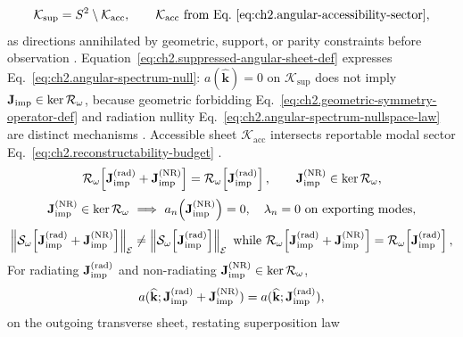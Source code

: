 \begin{equation}
\label{eq:ch2.suppressed-angular-sheet-def}
\mathcal{K}_{\mathrm{sup}}
=
S^{2}\setminus\mathcal{K}_{\mathrm{acc}},
\qquad
\mathcal{K}_{\mathrm{acc}}
\ \text{from Eq.~\eqref{eq:ch2.angular-accessibility-sector}},
\end{equation}
as directions annihilated by geometric, support, or parity constraints before observation
\cite{stratton1941}. Equation~\eqref{eq:ch2.suppressed-angular-sheet-def} expresses
Eq.~\eqref{eq:ch2.angular-spectrum-null}: \(a(\widehat{\mathbf{k}})=0\) on
\(\mathcal{K}_{\mathrm{sup}}\) does not imply \(\mathbf{J}_{\mathrm{imp}}\in\ker\mathcal{R}_\omega\), because
geometric forbidding Eq.~\eqref{eq:ch2.geometric-symmetry-operator-def} and radiation nullity
Eq.~\eqref{eq:ch2.angular-spectrum-nullspace-law} are distinct mechanisms
\cite{stratton1941}. Accessible sheet \(\mathcal{K}_{\mathrm{acc}}\) intersects reportable modal
sector Eq.~\eqref{eq:ch2.reconstructability-budget} \cite{harrington2001}.
\begin{equation}
\label{eq:ch2.nr-superposition-law}
\mathcal{R}_\omega\!\left[\mathbf{J}_{\mathrm{imp}}^{(\mathrm{rad})}+\mathbf{J}_{\mathrm{imp}}^{\mathrm{(NR)}}\right]
=
\mathcal{R}_\omega\!\left[\mathbf{J}_{\mathrm{imp}}^{(\mathrm{rad})}\right],
\qquad
\mathbf{J}_{\mathrm{imp}}^{\mathrm{(NR)}}\in\ker\mathcal{R}_\omega,
\end{equation}
\begin{equation}
\label{eq:ch2.nr-modal-invisibility}
\mathbf{J}_{\mathrm{imp}}^{\mathrm{(NR)}}\in\ker\mathcal{R}_\omega
\ \Longrightarrow\
a_n\!\left(\mathbf{J}_{\mathrm{imp}}^{\mathrm{(NR)}}\right)=0,
\quad
\lambda_n=0\ \text{on exporting modes,}
\end{equation}
\begin{equation}
\label{eq:ch2.nr-near-field-energy-law}
\left\|\mathcal{S}_\omega\!\left[\Jimp^{(\mathrm{rad})}+\Jimp^{\mathrm{(NR)}}\right]\right\|_{\mathcal{E}}
\neq
\left\|\mathcal{S}_\omega\!\left[\Jimp^{(\mathrm{rad})}\right]\right\|_{\mathcal{E}}
\ \text{while}\ 
\mathcal{R}_\omega\!\left[\Jimp^{(\mathrm{rad})}+\Jimp^{\mathrm{(NR)}}\right]
=
\mathcal{R}_\omega\!\left[\Jimp^{(\mathrm{rad})}\right],
\end{equation}
For radiating \(\mathbf{J}_{\mathrm{imp}}^{(\mathrm{rad})}\) and non-radiating
\(\mathbf{J}_{\mathrm{imp}}^{\mathrm{(NR)}}\in\ker\mathcal{R}_\omega\),
\begin{equation}
\label{eq:ch2.angular-spectrum-nr-invariance}
a(\widehat{\mathbf{k}};\mathbf{J}_{\mathrm{imp}}^{(\mathrm{rad})}+\mathbf{J}_{\mathrm{imp}}^{\mathrm{(NR)}})
=
a(\widehat{\mathbf{k}};\mathbf{J}_{\mathrm{imp}}^{(\mathrm{rad})}),
\end{equation}
on the outgoing transverse sheet, restating superposition law
